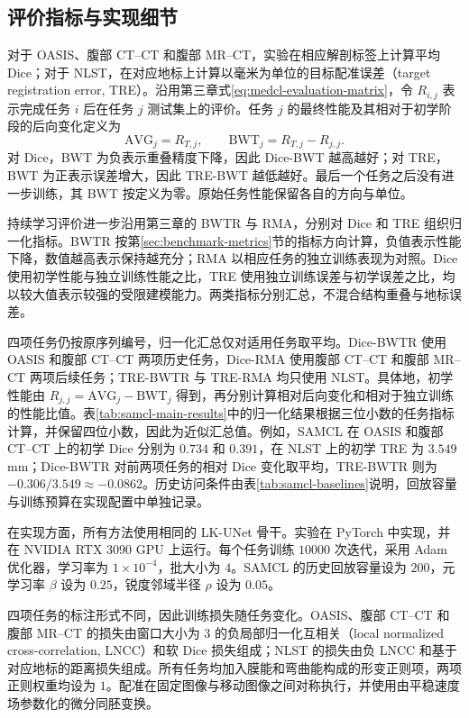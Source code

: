 \subsection{评价指标与实现细节}
\label{subsubsec:samcl-implementation}

对于 OASIS、腹部 CT--CT 和腹部 MR--CT，实验在相应解剖标签上计算平均 Dice；对于 NLST，在对应地标上计算以毫米为单位的目标配准误差（target registration error, TRE）。沿用第三章式\eqref{eq:medcl-evaluation-matrix}，令 $R_{i,j}$ 表示完成任务 $i$ 后在任务 $j$ 测试集上的评价。任务 $j$ 的最终性能及其相对于初学阶段的后向变化定义为
\begin{equation}
\mathrm{AVG}_j=R_{T,j},
\qquad
\mathrm{BWT}_j=R_{T,j}-R_{j,j}.
\label{eq:samcl-avg-bwt}
\end{equation}
对 Dice，BWT 为负表示重叠精度下降，因此 Dice-BWT 越高越好；对 TRE，BWT 为正表示误差增大，因此 TRE-BWT 越低越好。最后一个任务之后没有进一步训练，其 BWT 按定义为零。原始任务性能保留各自的方向与单位。

持续学习评价进一步沿用第三章的 BWTR 与 RMA，分别对 Dice 和 TRE 组织归一化指标。BWTR 按第\ref{sec:benchmark-metrics}节的指标方向计算，负值表示性能下降，数值越高表示保持越充分；RMA 以相应任务的独立训练表现为对照。Dice 使用初学性能与独立训练性能之比，TRE 使用独立训练误差与初学误差之比，均以较大值表示较强的受限建模能力。两类指标分别汇总，不混合结构重叠与地标误差。

四项任务仍按原序列编号，归一化汇总仅对适用任务取平均。Dice-BWTR 使用 OASIS 和腹部 CT--CT 两项历史任务，Dice-RMA 使用腹部 CT--CT 和腹部 MR--CT 两项后续任务；TRE-BWTR 与 TRE-RMA 均只使用 NLST。具体地，初学性能由 $R_{j,j}=\mathrm{AVG}_j-\mathrm{BWT}_j$ 得到，再分别计算相对后向变化和相对于独立训练的性能比值。表\ref{tab:samcl-main-results}中的归一化结果根据三位小数的任务指标计算，并保留四位小数，因此为近似汇总值。例如，SAMCL 在 OASIS 和腹部 CT--CT 上的初学 Dice 分别为 $0.734$ 和 $0.391$，在 NLST 上的初学 TRE 为 $3.549$ mm；Dice-BWTR 对前两项任务的相对 Dice 变化取平均，TRE-BWTR 则为 $-0.306/3.549\approx-0.0862$。历史访问条件由表\ref{tab:samcl-baselines}说明，回放容量与训练预算在实现配置中单独记录。

在实现方面，所有方法使用相同的 LK-UNet 骨干。实验在 PyTorch 中实现，并在 NVIDIA RTX 3090 GPU 上运行。每个任务训练 $10000$ 次迭代，采用 Adam 优化器\cite{kingma2015adam}，学习率为 $1\times10^{-4}$，批大小为 $4$。SAMCL 的历史回放容量设为 $200$，元学习率 $\beta$ 设为 $0.25$，锐度邻域半径 $\rho$ 设为 $0.05$。

四项任务的标注形式不同，因此训练损失随任务变化。OASIS、腹部 CT--CT 和腹部 MR--CT 的损失由窗口大小为 $3$ 的负局部归一化互相关（local normalized cross-correlation, LNCC）和软 Dice 损失组成\cite{avants2008syn,hu2018weakreg}；NLST 的损失由负 LNCC 和基于对应地标的距离损失组成。所有任务均加入膜能和弯曲能构成的形变正则项，两项正则权重均设为 $1$。配准在固定图像与移动图像之间对称执行，并使用由平稳速度场参数化的微分同胚变换。

